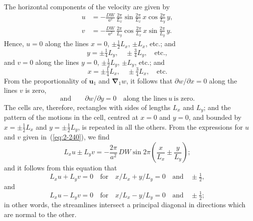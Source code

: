 The horizontal components of the velocity are given by
\begin{equation}
\label{eq:2-240}
\begin{split}
u &= -\frac{DW}{a^2}\,\frac{2\pi}{L_x}\sin\frac{2\pi}{L_x}\,x\cos\frac{2\pi}{L_y}\,y,\\
v &= -\frac{DW}{a^2}\,\frac{2\pi}{L_y}\cos\frac{2\pi}{L_x}\,x\sin\frac{2\pi}{L_y}\,y.
\end{split}
\end{equation}
Hence, $u = 0$ along the lines $x = 0$, $\pm\tfrac{1}{2}L_x$, $\pm L_x$, etc.; and
\begin{equation}
\label{eq:2-241}
y = \pm\tfrac{1}{4}L_y,\quad \pm\tfrac{3}{4}L_y,\quad\text{etc.},
\end{equation}
and \quad $v = 0$ along the lines $y = 0$, $\pm\tfrac{1}{2}L_y$, $\pm L_y$, etc.; and
\begin{equation}
\label{eq:2-242}
x = \pm\tfrac{1}{4}L_x,\quad \pm\tfrac{3}{4}L_x,\quad\text{etc.}
\end{equation}
From the proportionality of $\mathbf{u}_1$ and $\boldsymbol{\nabla}_1 w$, it follows that
$\partial w/\partial x = 0$ along the lines $v$ is zero,
\begin{equation}
\label{eq:2-242b}
\text{and}\qquad \partial w/\partial y = 0 \quad\text{along the lines}\ u\ \text{is zero.}
\end{equation}
The cells are, therefore, rectangles with sides of lengths $L_x$ and $L_y$; and
the pattern of the motions in the cell, centred at $x = 0$ and $y = 0$, and
bounded by $x = \pm\tfrac{1}{2}L_x$ and $y = \pm\tfrac{1}{2}L_y$, is repeated in all the others.
From the expressions for $u$ and $v$ given in~(\ref{eq:2-240}), we find
\begin{equation}
\label{eq:2-243}
L_x u \pm L_y v = -\frac{2\pi}{a^2}\,DW\sin 2\pi\!\left(\frac{x}{L_x}\pm\frac{y}{L_y}\right)\!;
\end{equation}
and it follows from this equation that
\begin{equation}
\label{eq:2-244}
L_x u + L_y v = 0 \quad\text{for}\quad x/L_x + y/L_y = 0 \quad\text{and}\quad \pm\tfrac{1}{2},
\end{equation}
and
\begin{equation}
\label{eq:2-245}
L_x u - L_y v = 0 \quad\text{for}\quad x/L_x - y/L_y = 0 \quad\text{and}\quad \pm\tfrac{1}{2};
\end{equation}
in other words, the streamlines intersect a principal diagonal in directions
which are normal to the other.

